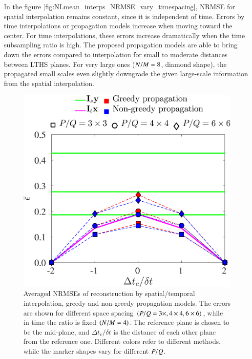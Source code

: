 In the figure \ref{fig:NLmean_interps_NRMSE_vary_timespacing}, NRMSE for spatial interpolation remains constant, since it is independent of time. Errors by time interpolations or propagation models increase when moving toward the center. For time interpolations, these errors increase dramatically when the time subsampling ratio is high. The proposed propagation models are able to bring down the errors compared to interpolation for small to moderate distances between LTHS planes. For very large ones ($ N/M=8 $, diamond shape), the propagated small scales even slightly downgrade the given large-scale information from the spatial interpolation.

\begin{figure}[t]
	\centering
	\includegraphics[width=0.65\columnwidth]{./images/NLM/interpdiff/NLmean_interps_NRMSE_vary_spacespacing.eps}		
	\caption{\label{fig:NLmean_interps_NRMSE_vary_spacespacing} Averaged NRMSEs of reconstruction by spatial/temporal interpolation, greedy and non-greedy propagation models. The errors are shown for different space spacing $ (P/Q=3 \times , 4 \times 4, 6 \times 6) $, while in time the ratio is fixed $ (N/M =4) $. The reference plane is chosen to be the mid-plane, and $ \Delta t_c/\delta t $ is the distance of each other plane from the reference one. Different colors refer to different methods, while the marker shapes vary for different $ P/Q $.}
\end{figure}

